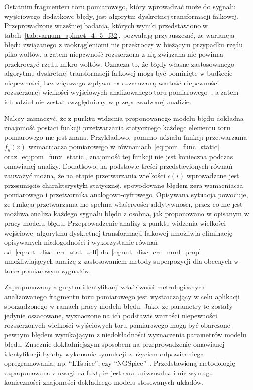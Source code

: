Ostatnim fragmentem toru pomiarowego, który wprowadzać może do sygnału wyjściowego dodatkowe błędy, jest algorytm dyskretnej transformacji falkowej. Przeprowadzone wcześniej badania, których wyniki przedstawiono w tabeli~\ref{tab:varnum_spline4_4_5_f32}, pozwalają przypuszczać, że wariancja błędu związanego z zaokrągleniami nie przekroczy w bieżącym przypadku rzędu piko woltów, a zatem niepewność rozszerzona z nią związana nie powinna przekroczyć rzędu mikro woltów. Oznacza to, że błędy własne zastosowanego algorytmu dyskretnej transformacji falkowej mogą być pominięte w budżecie niepewności, bez większego wpływu na oszacowaną wartość niepewności rozszerzonej wielkości wyjściowych analizowanego toru pomiarowego~\cite{jcgm_guide}, a zatem ich udział nie został uwzględniony w przeprowadzonej analizie.

Należy zaznaczyć, że z punktu widzenia proponowanego modelu błędu dokładna znajomość postaci funkcji przetwarzania statycznego każdego elementu toru pomiarowego nie jest znana. Przykładowo, pomimo udziału funkcji przetwarzania $f_{y}(x)$ wzmacniacza pomiarowego w równaniach~\eqref{eq:pom_func_static} oraz~\eqref{eq:pom_funx_static}, znajomość tej funkcji nie jest konieczna podczas omawianej analizy. Dodatkowo, na podstawie treści przedstawionych równań zauważyć można, że na etapie przetwarzania wielkości $c(i)$ wprowadzane jest przesunięcie charakterystyki statycznej, spowodowane błędem zera wzmacniacza pomiarowego i przetwornika analogowo-cyfrowego. Opisywana sytuacja powoduje, że funkcja przetwarzania nie spełnia właściwości addytywności, przez co nie jest możliwa analiza każdego sygnału błędu z osobna, jak proponowano w opisanym w pracy modelu błędu. Przeprowadzenie analizy z punktu widzenia wielkości wejściowej algorytmu dyskretnej transformacji falkowej umożliwia eliminację opisywanych niedogodności i wykorzystanie równań od~\eqref{eq:out_disc_err_stat_self} do~\eqref{eq:out_disc_err_rand_prop}, umożliwiających analizę z zastosowaniem metody superpozycji dla obecnych w torze pomiarowym sygnałów.

Zaproponowany algorytm identyfikacji właściwości metrologicznych analizowanego fragmentu toru pomiarowego jest wystarczający w celu aplikacji sporządzonego w ramach pracy modelu błędu. Jako, że parametry te zostały jedynie oszacowane, wyznaczone na ich podstawie wartości niepewności rozszerzonych wielkości wyjściowych toru pomiarowego mogą być obarczone pewnym błędem wynikającym z niedokładności wyznaczenia parametrów modelu błędu. Znacznie dokładniejszym sposobem na przeprowadzenie omawianej identyfikacji byłoby wykonanie symulacji z użyciem odpowiedniego oprogramowania, np. \enquote{LTspice}, czy \enquote{NGSpice}~\cite{mikkelsen_ltspice, nenzi_ngspice}. Przedstawioną metodologię zaproponowano z uwagi na fakt, że jest ona uniwersalna i nie wymaga konieczności znajomości dokładnego modelu stosowanych układów.

